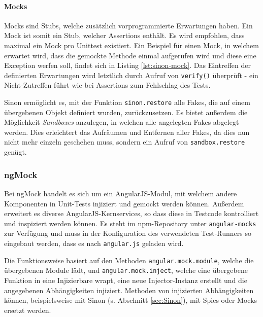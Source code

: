 \paragraph*{Mocks}
Mocks sind Stubs, welche zusätzlich vorprogrammierte Erwartungen haben. Ein Mock ist somit ein Stub, welcher Assertions enthält. Es wird empfohlen, dass maximal ein Mock pro Unittest existiert. Ein Beispiel für einen Mock, in welchem erwartet wird, dass die gemockte Methode einmal aufgerufen wird und diese eine Exception werfen soll, findet sich in Listing \ref{lst:sinon-mock}. Das Eintreffen der definierten Erwartungen wird letztlich durch Aufruf von \texttt{verify()} überprüft - ein Nicht-Zutreffen führt wie bei Assertions zum Fehlschlag des Tests.\cite{sinonjs-mocks}

\begin{figure}[H]
	
\end{figure}

Sinon ermöglicht es, mit der Funktion \texttt{sinon.restore} alle Fakes, die auf einem übergebenen Objekt definiert wurden, zurückzusetzen. Es bietet außerdem die Möglichkeit \textit{Sandboxes} anzulegen, in welchen alle angelegten Fakes abgelegt werden. Dies erleichtert das Aufräumen und Entfernen aller Fakes, da dies nun nicht mehr einzeln geschehen muss, sondern ein Aufruf von \texttt{sandbox.restore} genügt.\cite{sinonjs-sandboxes}

\subsubsection{ngMock}
\label{sec:ngMock}
Bei ngMock handelt es sich um ein AngularJS-Modul, mit welchem andere Komponenten in Unit-Tests injiziert und gemockt werden können. Außerdem erweitert es diverse AngularJS-Kernservices, so dass diese in Testcode kontrolliert und inspiziert werden können. Es steht im npm-Repository unter \texttt{angular-mocks} zur Verfügung und muss in der Konfiguration des verwendeten Test-Runners so eingebaut werden, dass es nach \texttt{angular.js} geladen wird.\cite{angular-ngMock}

Die Funktionsweise basiert auf den Methoden \texttt{angular.mock.module}, welche die übergebenen Module lädt\cite{angular-ngMockModule}, und \texttt{angular.mock.inject}, welche eine übergebene Funktion in eine Injizierbare wrapt, eine neue Injector-Instanz erstellt und die angegebenen Abhängigkeiten injiziert\cite{angular-ngMockInject}. Methoden von injizierten Abhängigkeiten können, beispielsweise mit Sinon (s. Abschnitt \ref{sec:Sinon}), mit Spies oder Mocks ersetzt werden.


